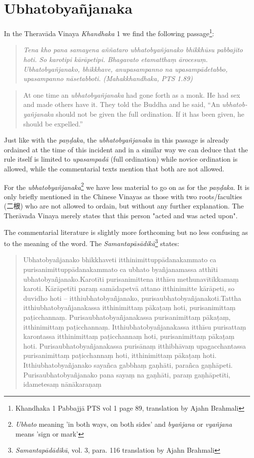 \section{Ubhatob­yañ­janaka}
In the Theravāda Vinaya {\em Khandhaka} 1 we find the following passage\footnote{Khandhaka 1 Pabbajjā PTS vol 1 page 89, translation by Ajahn Brahmali}:

\begin{quote}
{\em Tena kho pana samayena aññataro ubhatobyañjanako bhikkhūsu pabbajito hoti. So karotipi kārāpetipi. Bhagavato etamatthaṃ ārocesuṃ. Ubhatobyañjanako, bhikkhave, anupasampanno na upasampādetabbo, upasampanno nāsetabboti. (Mahakkhandhaka, PTS 1.89)}
\end{quote}

\begin{quote}
At one time an {\em ubhatob­yañ­janaka} had gone forth as a monk. He had sex and made others have it. They told the Buddha and he said, “An {\em ubhatob­yañ­janaka} should not be given the full ordination. If it has been given, he should be expelled.”
\end{quote}

Just like with the {\em paṇḍaka}, the {\em ubhatob­yañ­janaka} in this passage is already ordained at the time of this incident and in a similar way we can deduce that the rule itself is limited to {\em upasampadā} (full ordination) while novice ordination is allowed, while the commentarial texts mention that both are not allowed.

For the {\em ubhatob­yañ­janaka}\footnote{{\em Ubhato} meaning 'in both ways, on both sides' and {\em byañjana} or {\em vyañjana} means 'sign or mark'} we have less material to go on as for the {\em paṇḍaka}. It is only briefly mentioned in the Chinese Vinayas as those with two roots/faculties (二根) who are not allowed to ordain, but without any further explanation. The Therāvada Vinaya merely states that this person "acted and was acted upon". 

The commentarial literature is slightly more forthcoming but no less confusing as to the meaning of the word. The {\em Samantapāsādikā}\footnote{{\em Samantapādādikā}, vol. 3, para. 116 translation by Ajahn Brahmali} states:

\begin{quote}
Ubhatobyañjanako bhikkhaveti itthinimittuppādanakammato ca purisanimittuppādanakammato ca ubhato byañjanamassa atthīti ubhatobyañjanako.Karotīti purisanimittena itthīsu methunavītikkamaṃ karoti. Kārāpetīti paraṃ samādapetvā attano itthinimitte kārāpeti, so duvidho hoti – itthiubhatobyañjanako, purisaubhatobyañjanakoti.Tattha itthiubhatobyañjanakassa itthinimittaṃ pākaṭaṃ hoti, purisanimittaṃ paṭicchannaṃ. Purisaubhatobyañjanakassa purisanimittaṃ pākaṭaṃ, itthinimittaṃ paṭicchannaṃ. Itthiubhatobyañjanakassa itthīsu purisattaṃ karontassa itthinimittaṃ paṭicchannaṃ hoti, purisanimittaṃ pākaṭaṃ hoti. Purisaubhatobyañjanakassa purisānaṃ itthibhāvaṃ upagacchantassa purisanimittaṃ paṭicchannaṃ hoti, itthinimittaṃ pākaṭaṃ hoti. Itthiubhatobyañjanako sayañca gabbhaṃ gaṇhāti, parañca gaṇhāpeti. Purisaubhatobyañjanako pana sayaṃ na gaṇhāti, paraṃ gaṇhāpetīti, idametesaṃ nānākaraṇaṃ
\end{quote}
\medskip

